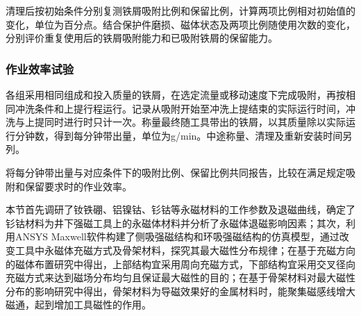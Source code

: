 清理后按初始条件分别复测铁屑吸附比例和保留比例，计算两项比例相对初始值的变化，单位为百分点。结合保护件磨损、磁体状态及两项比例随使用次数的变化，分别评价重复使用后的铁屑吸附能力和已吸附铁屑的保留能力。

\subsubsection{作业效率试验}
各组采用相同组成和投入质量的铁屑，在选定流量或移动速度下完成吸附，再按相同冲洗条件和上提行程运行。记录从吸附开始至冲洗上提结束的实际运行时间，冲洗与上提同时进行时只计一次。称量最终随工具带出的铁屑，以其质量除以实际运行分钟数，得到每分钟带出量，单位为g/min。中途称量、清理及重新安装时间另列。

将每分钟带出量与对应条件下的吸附比例、保留比例共同报告，比较在满足规定吸附和保留要求时的作业效率。

本节首先调研了钕铁硼、铝镍钴、钐钴等永磁材料的工作参数及退磁曲线，确定了钐钴材料为井下强磁工具上的永磁体材料并分析了永磁体退磁影响因素；其次，利用ANSYS Maxwell软件构建了侧吸强磁结构和环吸强磁结构的仿真模型，通过改变工具中永磁体充磁方式及骨架材料，探究其最大磁性分布规律；在基于充磁方向的磁体布置研究中得出，上部结构宜采用周向充磁方式，下部结构宜采用交叉径向充磁方式来达到磁场分布均匀且保证最大磁性的目的；在基于骨架材料对最大磁性分布的影响研究中得出，骨架材料为导磁效果好的金属材料时，能聚集磁感线增大磁通，起到增加工具磁性的作用。

